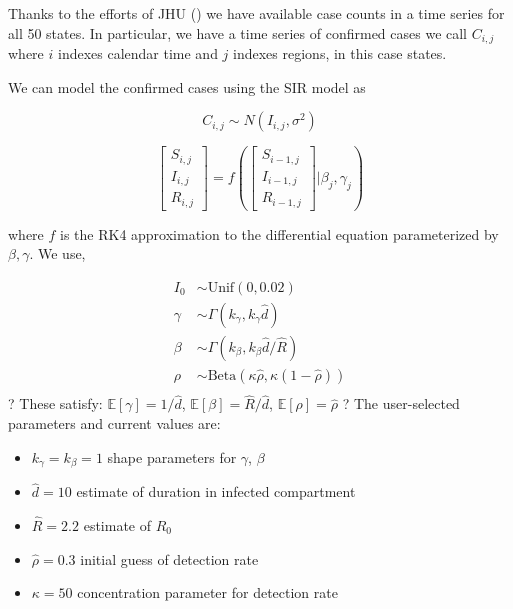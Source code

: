 \documentclass{article}
\newcommand{\Unif}{\text{Unif}}
\newcommand{\Beta}{\text{Beta}}
\newcommand{\E}{\mathbb{E}}
\begin{document}
Thanks to the efforts of JHU (\cite{https://www.google.com/url?q=https://github.com/CSSEGISandData/COVID-19/&sa=D&source=hangouts&ust=1584972954968000&usg=AFQjCNGnOaY2YaOoRx7GLJkyiEmNRlz7Aw}) we have available case counts in a time series for all 50 states. In particular, we have a time series of confirmed cases we call $C_{i,j}$ where $i$ indexes calendar time and $j$ indexes regions, in this case states. 

We can model the confirmed cases using the SIR model as 


\begin{equation}
  C_{i,j} \sim N(I_{i,j},\sigma^2) 
 \end{equation}
  
  \begin{equation}
\begin{bmatrix} S_{i,j} \\
   I_{i,j} \\
   R_{i,j} 
  \end{bmatrix}  
  =  f\left(
  \begin{bmatrix} S_{i-1,j} \\
   I_{i-1,j} \\
   R_{i-1,j} 
  \end{bmatrix}|\beta_j,\gamma_j \right)
\end{equation}

where $f$ is the RK4 approximation to the differential equation parameterized by $\beta,\gamma$. We use, 




$$
\begin{aligned}
I_0 &\sim \Unif(0, 0.02) \\
\gamma &\sim \Gamma(k_\gamma, k_\gamma \hat{d}) \\
\beta &\sim \Gamma(k_\beta, k_\beta \hat{d}/\hat{R}) \\
\rho &\sim \Beta(\kappa\hat{\rho}, \kappa(1-\hat{\rho}))\\
\end{aligned}
$$
?
These satisfy: $\E[\gamma] = 1/\hat{d}$, $\E[\beta] = \hat{R}/\hat{d}$, $\E[\rho] = \hat{\rho}$
?
The user-selected parameters and current values are:
\begin{itemize}
 \item $k_\gamma = k_\beta = 1$ shape parameters for $\gamma$, $\beta$
\item $\hat{d} = 10$ estimate of duration in infected compartment
\item $\hat{R} = 2.2$ estimate of $R_0$
\item  $\hat{\rho} = 0.3$ initial guess of detection rate
\item $\kappa = 50$ concentration parameter for detection rate
\end{itemize}
\end{document}
